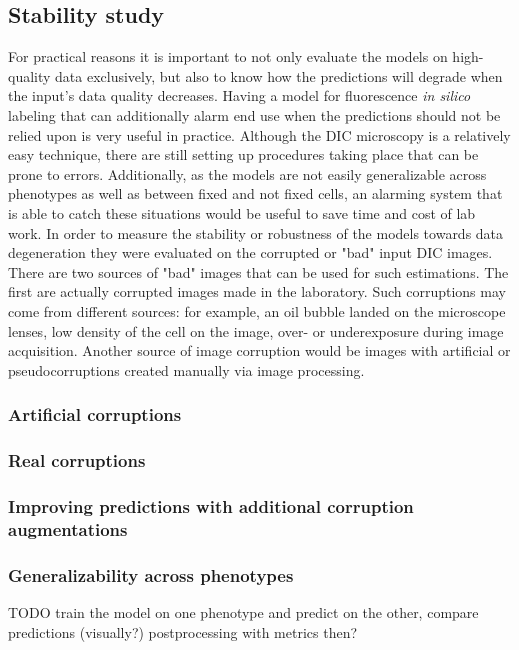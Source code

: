\subsection{Stability study}
    For practical reasons it is important to not only evaluate the models on high-quality data exclusively, but also to know how the predictions will degrade when the input's data quality decreases. Having a model for fluorescence \textit{in silico} labeling that can additionally alarm end use when the predictions should not be relied upon is very useful in practice. Although the DIC microscopy is a relatively easy technique, there are still setting up procedures taking place that can be prone to errors. Additionally, as the models are not easily generalizable across phenotypes as well as between fixed and not fixed cells, an alarming system that is able to catch these situations would be useful to save time and cost of lab work. In order to measure the stability or robustness of the models towards data degeneration they were evaluated on the corrupted or "bad" input DIC images. There are two sources of "bad" images that can be used for such estimations. The first are actually corrupted images made in the laboratory. Such corruptions may come from different sources: for example, an oil bubble landed on the microscope lenses, low density of the cell on the image, over- or underexposure during image acquisition. Another source of image corruption would be images with artificial or pseudocorruptions created manually via image processing. 
    
    \subsubsection{Artificial corruptions}
        
    \subsubsection{Real corruptions}
        \label{section:real-corruptions}
        
    \subsubsection{Improving predictions with additional corruption augmentations}
        \label{section:augments-againts-corruptions}
        
    \subsubsection{Generalizability across phenotypes}
        TODO train the model on one phenotype and predict on the other, compare predictions (visually?)
        postprocessing with metrics then?